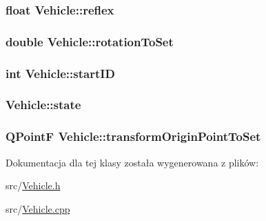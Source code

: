 \hypertarget{class_vehicle_a2742f50ec74d5b8ac0f81d3222842110}{
\subsubsection[{reflex}]{\setlength{\rightskip}{0pt plus 5cm}float Vehicle\-::reflex\hspace{0.3cm}{\ttfamily [private]}}}\label{class_vehicle_a2742f50ec74d5b8ac0f81d3222842110}
\hypertarget{class_vehicle_a15bac66c5ee90f81529c9eb5ba2d7b3c}{
\subsubsection[{rotation\-To\-Set}]{\setlength{\rightskip}{0pt plus 5cm}double Vehicle\-::rotation\-To\-Set\hspace{0.3cm}{\ttfamily [private]}}}\label{class_vehicle_a15bac66c5ee90f81529c9eb5ba2d7b3c}
\hypertarget{class_vehicle_a4b941cb02036dc75ae4ad733e3493119}{
\subsubsection[{start\-I\-D}]{\setlength{\rightskip}{0pt plus 5cm}int Vehicle\-::start\-I\-D\hspace{0.3cm}{\ttfamily [private]}}}\label{class_vehicle_a4b941cb02036dc75ae4ad733e3493119}
\hypertarget{class_vehicle_ab3541bd459598db80bb2748db1452feb}{
\subsubsection[{state}]{ Vehicle\-::state\hspace{0.3cm}{\ttfamily [private]}}}\label{class_vehicle_ab3541bd459598db80bb2748db1452feb}
\hypertarget{class_vehicle_ad04fb4832c299dd0508e3b335fa5ce20}{
\subsubsection[{transform\-Origin\-Point\-To\-Set}]{\setlength{\rightskip}{0pt plus 5cm}Q\-Point\-F Vehicle\-::transform\-Origin\-Point\-To\-Set\hspace{0.3cm}{\ttfamily [private]}}}\label{class_vehicle_ad04fb4832c299dd0508e3b335fa5ce20}


Dokumentacja dla tej klasy została wygenerowana z plików\-:\begin{DoxyCompactItemize}
\item 
src/\hyperlink{_vehicle_8h}{Vehicle.\-h}\item 
src/\hyperlink{_vehicle_8cpp}{Vehicle.\-cpp}\end{DoxyCompactItemize}
